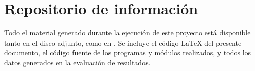 \section{Repositorio de información}
Todo el material generado durante la ejecución de este proyecto está disponible tanto en el disco adjunto, como en \thegitrepo{}. Se incluye el código \LaTeX{} del presente documento, el código fuente de los programas y módulos realizados, y todos los datos generados en la evaluación de resultados.











